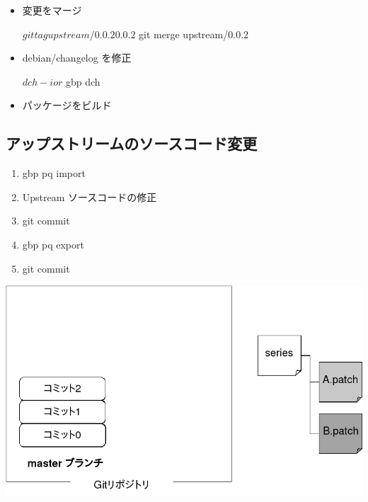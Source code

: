 \documentclass[mingoth,a4paper]{jsarticle}
\begin{document}
\begin{itemize}
\item 変更をマージ

\begin{commandline}
$ git tag upstream/0.0.2 0.0.2
$ git merge upstream/0.0.2
\end{commandline}
\end{itemize}

\begin{itemize}
\item debian/changelog を修正

\begin{commandline}
$ dch -i
or
$ gbp dch
\end{commandline}
\end{itemize}

\begin{itemize}
\item パッケージをビルド


\end{itemize}

\subsection{アップストリームのソースコード変更}

\begin{enumerate}
\item gbp pq import
\item Upstream ソースコードの修正
\item git commit
\item gbp pq export
\item git commit
\end{enumerate}

\begin{center}
\includegraphics[width=0.8\hsize]{image201509/gbp-pq0_mono.png}
\end{center}
\end{document}

